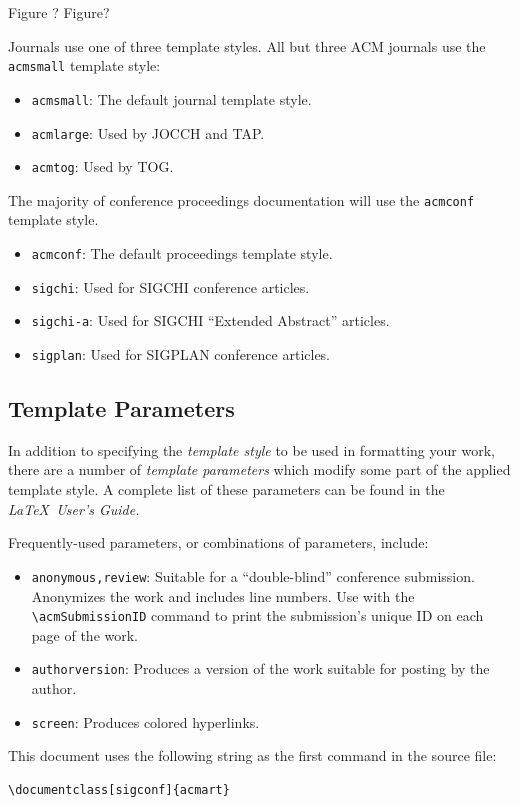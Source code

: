 \documentclass[sigconf]{acmart}
\begin{document}
Figure ?
Figure?




Journals use one of three template styles. All but three ACM journals
use the {\verb|acmsmall|} template style:
\begin{itemize}
\item {\verb|acmsmall|}: The default journal template style.
\item {\verb|acmlarge|}: Used by JOCCH and TAP.
\item {\verb|acmtog|}: Used by TOG.
\end{itemize}


The majority of conference proceedings documentation will use the {\verb|acmconf|} template style.
\begin{itemize}
\item {\verb|acmconf|}: The default proceedings template style.
\item{\verb|sigchi|}: Used for SIGCHI conference articles.
\item{\verb|sigchi-a|}: Used for SIGCHI ``Extended Abstract'' articles.
\item{\verb|sigplan|}: Used for SIGPLAN conference articles.
\end{itemize}

\subsection{Template Parameters}

In addition to specifying the {\itshape template style} to be used in
formatting your work, there are a number of {\itshape template parameters}
which modify some part of the applied template style. A complete list
of these parameters can be found in the {\itshape \LaTeX\ User's Guide.}

Frequently-used parameters, or combinations of parameters, include:
\begin{itemize}
\item {\verb|anonymous,review|}: Suitable for a ``double-blind''
  conference submission. Anonymizes the work and includes line
  numbers. Use with the \verb|\acmSubmissionID| command to print the
  submission's unique ID on each page of the work.
\item{\verb|authorversion|}: Produces a version of the work suitable
  for posting by the author.
\item{\verb|screen|}: Produces colored hyperlinks.
\end{itemize}

This document uses the following string as the first command in the
source file:
\begin{verbatim}
\documentclass[sigconf]{acmart}
\end{verbatim}
\end{document}
